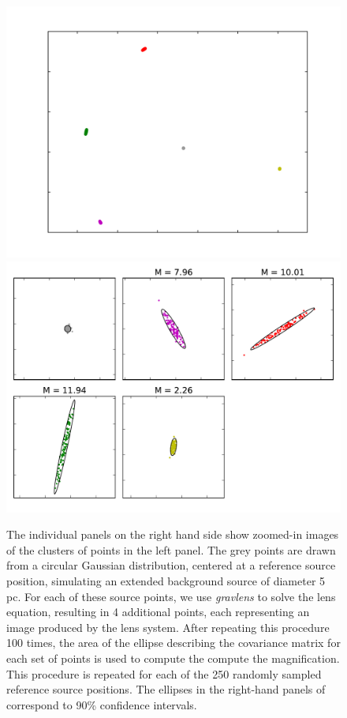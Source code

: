\begin{figure}
	\label{fig:mag_illustration}
	\includegraphics[trim=0cm 0cm 0cm 0cm,clip,width=.48\textwidth]{./figures_sls/mag_illustration1-eps-converted-to.pdf}
	\includegraphics[trim=0cm 0cm 0cm 0cm,clip,width=.48\textwidth]{./figures_sls/mag_illustration2-eps-converted-to.pdf}
	\caption{The individual panels on the right hand side show zoomed-in images of the clusters of points in the left panel. The grey points are drawn from a circular Gaussian distribution, centered at a reference source position, simulating an extended background source of diameter 5 pc. For each of these source points, we use \textit{gravlens} to solve the lens equation, resulting in 4 additional points, each representing an image produced by the lens system. After repeating this procedure 100 times, the area of the ellipse describing the covariance matrix for each set of points is used to compute the compute the magnification. This procedure is repeated for each of the 250 randomly sampled reference source positions. The ellipses in the right-hand panels of correspond to 90\% confidence intervals.}
\end{figure}


